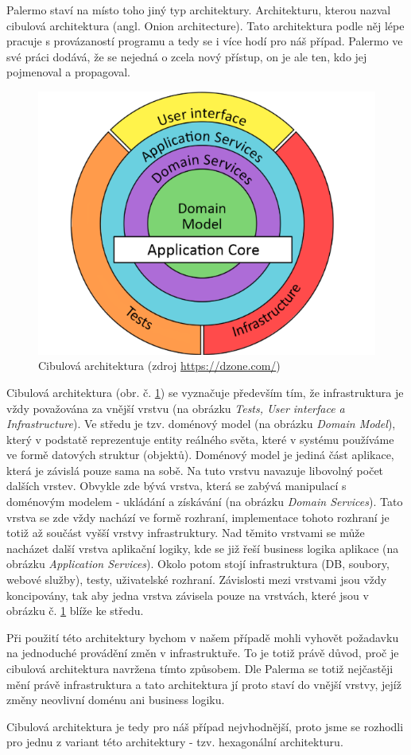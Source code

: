 \par
Palermo staví na místo toho jiný typ architektury. Architekturu, kterou nazval cibulová architektura (angl. Onion architecture). Tato architektura podle něj lépe pracuje s provázaností programu \cite{palermo} a tedy se i více hodí pro náš případ. Palermo ve své práci dodává, že se nejedná o zcela nový přístup, on je ale ten, kdo jej pojmenoval a propagoval.\par
\begin{figure}[htbp!]
	\includegraphics[width=0.7\linewidth]{img/onion.png}
	\caption{Cibulová architektura (zdroj \url{https://dzone.com/})}
	\label{fig:onion}
\end{figure}
Cibulová architektura (obr. č. \ref{fig:onion}) se vyznačuje především tím, že infrastruktura je vždy považována za vnější vrstvu (na obrázku \textit{Tests, User interface a Infrastructure}). Ve středu je tzv. doménový model (na obrázku \textit{Domain Model}), který v podstatě reprezentuje entity reálného světa, které v systému používáme \cite{palermo} ve formě datových struktur (objektů). Doménový model je jediná část aplikace, která je závislá pouze sama na sobě. Na tuto vrstvu navazuje libovolný počet dalších vrstev. Obvykle zde bývá vrstva, která se zabývá manipulací s doménovým modelem - ukládání a získávání (na obrázku \textit{Domain Services}). Tato vrstva se zde vždy nachází ve formě rozhraní, implementace tohoto rozhraní je totiž až součást vyšší vrstvy infrastruktury. Nad těmito vrstvami se může nacházet další vrstva aplikační logiky, kde se již řeší business logika aplikace (na obrázku \textit{Application Services}). Okolo potom stojí infrastruktura (DB, soubory, webové služby), testy, uživatelské rozhraní. Závislosti mezi vrstvami jsou vždy koncipovány, tak aby jedna vrstva závisela pouze na vrstvách, které jsou v obrázku č. \ref{fig:onion} blíže ke středu. \cite{palermo}\par
Při použití této architektury bychom v našem případě mohli vyhovět požadavku na jednoduché provádění změn v infrastruktuře. To je totiž právě důvod, proč je cibulová architektura navržena tímto způsobem. Dle Palerma se totiž nejčastěji mění právě infrastruktura a tato architektura jí proto staví do vnější vrstvy, jejíž změny neovlivní doménu ani business logiku. \cite{palermo}\par
Cibulová architektura je tedy pro náš případ nejvhodnější, proto jsme se rozhodli pro jednu z variant této architektury - tzv. hexagonální architekturu.

